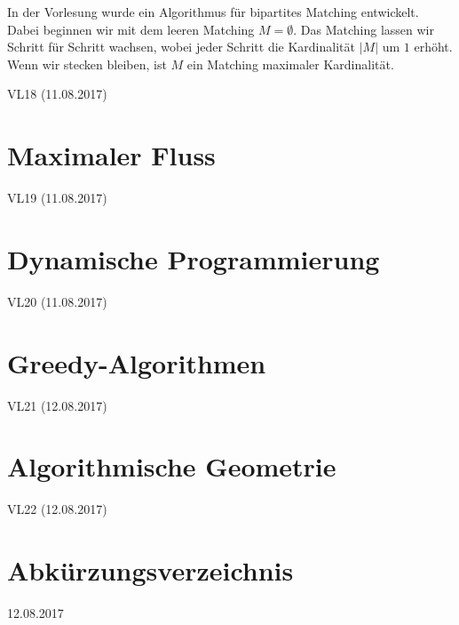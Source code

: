 \documentclass[12pt]{article}
\begin{document}
In der Vorlesung wurde ein Algorithmus für bipartites Matching entwickelt. Dabei beginnen wir mit dem leeren Matching $M = \emptyset$. Das Matching lassen wir Schritt für Schritt wachsen, wobei jeder Schritt die Kardinalität $|M|$ um $1$ erhöht. Wenn wir stecken bleiben, ist $M$ ein Matching maximaler Kardinalität.

VL18 (11.08.2017)

\section{Maximaler Fluss}

VL19 (11.08.2017)

\section{Dynamische Programmierung}

VL20 (11.08.2017)

\section{Greedy-Algorithmen}

VL21 (12.08.2017)

\section{Algorithmische Geometrie}

VL22 (12.08.2017)

\section{Abkürzungsverzeichnis}

12.08.2017
\end{document}
